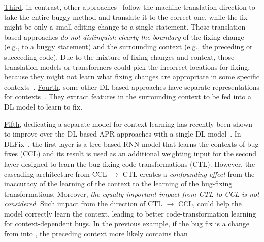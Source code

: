 \underline{Third}, in contrast, other
approaches~\cite{hata2018learning,tufano2019learning,tufano2018empirical}
follow the machine translation direction to take the entire buggy
method and translate it to the correct one, while the fix might be
only a small editing change to a single statement. Those
translation-based approaches {\em do not distinguish clearly the
  boundary} of the fixing change (e.g., to a buggy statement) and the
surrounding context (e.g., the preceding or succeeding code). Due to
the mixture of fixing changes and context, those translation models or
transformers could pick the incorrect locations for fixing, because
they might not learn what fixing changes are appropriate in some specific
contexts~\cite{icse20}. \underline{Fourth}, some other DL-based
approaches have separate representations for
contexts~\cite{chen2018sequencer,cure-icse21,lutellier2020coconut}.
They extract features in the surrounding context to be fed into a DL
model to learn to fix.

\underline{Fifth}, dedicating a separate model for context learning
has recently been shown to improve over the DL-based APR approaches
with a single DL model~\cite{icse20}. In DLFix~\cite{icse20}, the
first layer is a tree-based RNN model that learns the contexts of bug
fixes (CCL) and its result is used as an additional weighting input
for the second layer designed to learn the bug-fixing code
transformations (CTL). However, the cascading architecture from CCL
$\rightarrow$ CTL creates a {\em confounding effect} from the inaccuracy of
the learning of the context to the learning of the bug-fixing
transformations. Moreover, {\em the equally important impact from CTL to
CCL is not considered}. Such impact from the direction of CTL
$\rightarrow$ CCL, could help the model correctly learn the context,
leading to better code-transformation learning for context-dependent
bugs. In the previous example, if the bug fix is a change from
 into , the preceding
context more likely contains  than .





